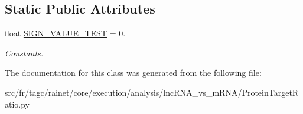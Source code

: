 \subsection*{Static Public Attributes}
\begin{DoxyCompactItemize}
\item 
\hypertarget{classsrc_1_1fr_1_1tagc_1_1rainet_1_1core_1_1execution_1_1analysis_1_1lncRNA__vs__mRNA_1_1Proteina176ab8e17ed9f2c0909191b1bb30397_a4114073d7f6e2fb9742fd5484d8ec5d1}{float \hyperlink{classsrc_1_1fr_1_1tagc_1_1rainet_1_1core_1_1execution_1_1analysis_1_1lncRNA__vs__mRNA_1_1Proteina176ab8e17ed9f2c0909191b1bb30397_a4114073d7f6e2fb9742fd5484d8ec5d1}{S\-I\-G\-N\-\_\-\-V\-A\-L\-U\-E\-\_\-\-T\-E\-S\-T} = 0.}\label{classsrc_1_1fr_1_1tagc_1_1rainet_1_1core_1_1execution_1_1analysis_1_1lncRNA__vs__mRNA_1_1Proteina176ab8e17ed9f2c0909191b1bb30397_a4114073d7f6e2fb9742fd5484d8ec5d1}

\begin{DoxyCompactList}\small\item\em Constants. \end{DoxyCompactList}\end{DoxyCompactItemize}


The documentation for this class was generated from the following file\-:\begin{DoxyCompactItemize}
\item 
src/fr/tagc/rainet/core/execution/analysis/lnc\-R\-N\-A\-\_\-vs\-\_\-m\-R\-N\-A/Protein\-Target\-Ratio.\-py\end{DoxyCompactItemize}

